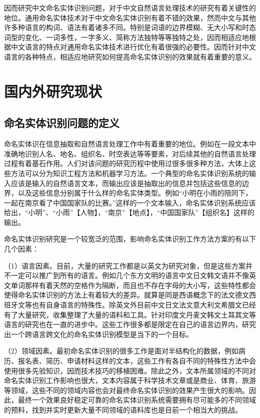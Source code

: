 \documentclass[winfonts,master,oneside,nobackinfo]{njuthesis}
\begin{document}
因而研究中文命名实体识别问题，对于中文自然语言处理技术的研究有着关键性的地位。通用命名实体技术对于中文命名实体识别有着不错的效果，然而中文与其他许多种语言的构词、语法有着诸多不同。特别是词语的边界模糊、无大小写和时态词型的变化、一词多性，一字多义、简称方法独特等等独特之处，因而相适应地根据中文语言的特点对通用命名实体技术进行优化有着很强的必要性。因而针对中文语言的各种特点，相适应地研究如何提高命名实体识别的效果就有着重要的意义。



\section{国内外研究现状}
\subsection{命名实体识别问题的定义}
命名实体识在信息抽取和自然语言处理工作中有着重要的地位。例如在一段文本中准确地识别人名、地名、组织名、时空表达等等要素，对后续其他的自然语言处理过程有着基石作用。人们对该问题的研究历程中使用过很多很多种方法，大体上这些方法可以分为知识工程方法和机器学习方法。一个典型的命名实体识别系统的输入应该是输入的自然语言文本，而输出应该是抽取出的信息并包括这些信息的边界，以及这些信息分别属于什么样的命名实体类型。例如“小明在小雨的陪同下，一起在南京看了中国国家队的比赛。”这样的一个文本输入，命名实体识别系统应该给出，“小明”、“小雨”【人物】，“南京”【地点】，“中国国家队”【组织名】这样的输出。

命名实体识别研究是一个较宽泛的范围，影响命名实体识别工作方法方案的有以下几个因素\cite{ASTUDY}：

（1）语言因素。目前，大量的研究工作都是以英文为研究对象，但是这些方案并不一定可以推广到所有的语言。例如几个东方文明的语言中文日文韩文语并不像英文单词那样有着天然的空格作为隔断，而且也不存在字母的大小写，这些特性都会使得命名实体识别的方法上有着较大的差异。就算是同是西语概念下的法文德文西班牙文等也有自身语言的特殊性。除英文外目前中文日文法文意大利文希腊文已经有了大量研究，收集整理了大量的语料和工具。针对印度文丹麦文韩文土耳其文等语言的研究也在一直的进步中。这些工作很多都是限定在自己的语言边界内，研究出一个跨语言跨文化的命名实体识别模型是当下的一个目标。

（2）领域因素。最初命名实体识别的很多工作是面对半结构化的数据，例如病历、报名表、简历、申请材料这样的文本，这些工作有各自不同的特殊性方法中会使用很多先验知识，因而技术技巧的移植困难。除此之外，文本所属领域的不同对命名实体识别工作影响也很大，文本内容属于科学技术文章或是商业、体育、旅游等领域，这些不同的领域内容也会对最终命名实体识别的效果产生很大的影响。因此，最终一个效果良好稳定可靠的命名实体识别系统需要拥有尽可能多的不同领域的预料，找到并实时更新大量不同领域的语料库也是目前一个相当大的挑战。
\end{document}
